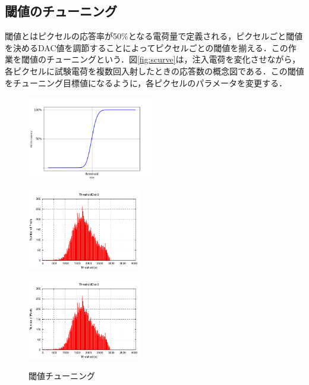 \subsection{閾値のチューニング}
閾値とはピクセルの応答率が50$\mathrm{\%}$となる電荷量で定義される，ピクセルごと閾値を決めるDAC値を調節することによってピクセルごとの閾値を揃える．この作業を閾値のチューニングという．図\ref{fig:scurve}は，注入電荷を変化させながら，各ピクセルに試験電荷を複数回入射したときの応答数の概念図である．この閾値をチューニング目標値になるように，各ピクセルのパラメータを変更する．
\begin{figure}[h]
  \centering
  \begin{minipage}[b]{0.3\linewidth}
    \centering
    \includegraphics[width=5.5cm]{./figure/scurve.png}
    \label{fig:scurve}
  \end{minipage}
  \begin{minipage}[b]{0.3\linewidth}
    \includegraphics[width=5cm]{./figure/ThrDistBefore.pdf}
    \label{fig:ThrDistBefore}
  \end{minipage}
  \begin{minipage}[b]{0.3\linewidth}
    \includegraphics[width=5cm]{./figure/ThrDistBefore.pdf}
    \label{fig:ThrDistAfter}
  \end{minipage}
  \caption{閾値チューニング}
\end{figure}

